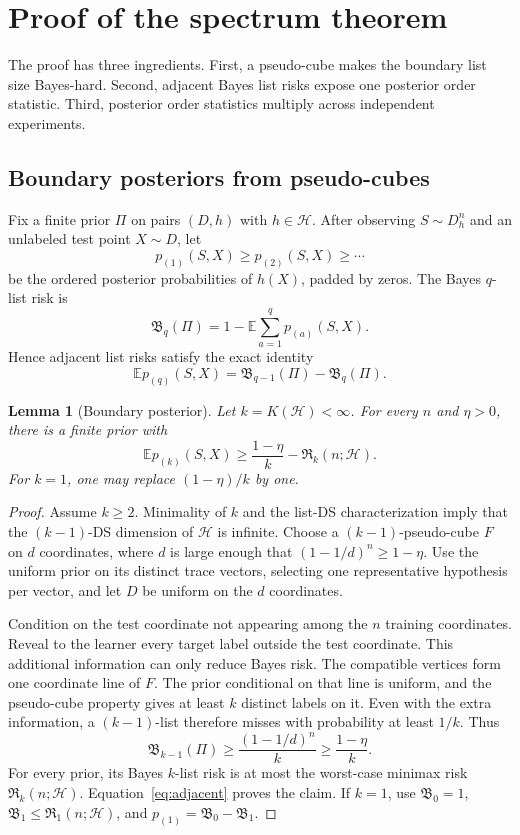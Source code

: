 \documentclass{article}
\newtheorem{lemma}[theorem]{Lemma}
\theoremstyle{definition}
\theoremstyle{remark}
\newcommand{\E}{\mathbb E}
\newcommand{\cH}{\mathcal H}
\newcommand{\Risk}{\mathfrak R}
\newcommand{\Bayes}{\mathfrak B}
\newcommand{\1}{\mathbf 1}
\begin{document}
\section{Proof of the spectrum theorem}
\label{sec:proof}

The proof has three ingredients. First, a pseudo-cube makes the boundary list size Bayes-hard. Second, adjacent Bayes list risks expose one posterior order statistic. Third, posterior order statistics multiply across independent experiments.

\subsection{Boundary posteriors from pseudo-cubes}

Fix a finite prior \(\Pi\) on pairs \((D,h)\) with \(h\in\cH\). After observing \(S\sim D_h^n\) and an unlabeled test point \(X\sim D\), let \[ p_{(1)}(S,X)\ge p_{(2)}(S,X)\ge\cdots \] be the ordered posterior probabilities of \(h(X)\), padded by zeros. The Bayes \(q\)-list risk is \[ \Bayes_q(\Pi)=1-\E\sum_{a=1}^q p_{(a)}(S,X). \] Hence adjacent list risks satisfy the exact identity
\begin{equation}
\label{eq:adjacent}
\E p_{(q)}(S,X)=\Bayes_{q-1}(\Pi)-\Bayes_q(\Pi).
\end{equation}

\begin{lemma}[Boundary posterior]
\label{lem:boundary}
Let \(k=K(\cH)<\infty\). For every \(n\) and \(\eta>0\), there is a finite prior with \[ \E p_{(k)}(S,X)\ge\frac{1-\eta}{k}-\Risk_k(n;\cH). \] For \(k=1\), one may replace \((1-\eta)/k\) by one.
\end{lemma}

\begin{proof}
Assume \(k\ge2\). Minimality of \(k\) and the list-DS characterization imply that the \((k-1)\)-DS dimension of \(\cH\) is infinite. Choose a \((k-1)\)-pseudo-cube \(F\) on \(d\) coordinates, where \(d\) is large enough that \((1-1/d)^n\ge1-\eta\). Use the uniform prior on its distinct trace vectors, selecting one representative hypothesis per vector, and let \(D\) be uniform on the \(d\) coordinates.

Condition on the test coordinate not appearing among the \(n\) training coordinates. Reveal to the learner every target label outside the test coordinate. This additional information can only reduce Bayes risk. The compatible vertices form one coordinate line of \(F\). The prior conditional on that line is uniform, and the pseudo-cube property gives at least \(k\) distinct labels on it. Even with the extra information, a \((k-1)\)-list therefore misses with probability at least \(1/k\). Thus \[ \Bayes_{k-1}(\Pi)\ge\frac{(1-1/d)^n}{k}\ge\frac{1-\eta}{k}. \] For every prior, its Bayes \(k\)-list risk is at most the worst-case minimax risk \(\Risk_k(n;\cH)\). Equation~\eqref{eq:adjacent} proves the claim. If \(k=1\), use \(\Bayes_0=1\), \(\Bayes_1\le\Risk_1(n;\cH)\), and \(p_{(1)}=\Bayes_0-\Bayes_1\).
\end{proof}
\end{document}
